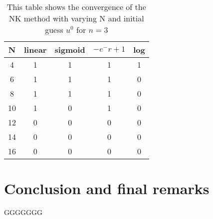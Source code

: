 \documentclass{article}
\begin{document}
\begin{table}[H]
\centering
\begin{tabular}{|c|c|c|c|c|}
\hline
N                                          & linear  & sigmoid & $-e^-r + 1$ &log \\
\hline
4                                          & 1 & 1 & 1 & 1\\
6                                          & 1 & 1 & 1 & 0\\
8                                          & 1 & 1 & 1 & 0\\
10                                         & 1 & 0 & 1 & 0\\
12                                         & 0 & 0 & 0 & 0\\
14                                         & 0 & 0 & 0 & 0\\
16                                         & 0 & 0 & 0 & 0\\
\hline
\end{tabular}
\caption{This table shows the convergence of the NK method with varying N and initial guess $u^0$ for $n=3$}
\end{table}

\section{Conclusion and final remarks}
GGGGGGG
\end{document}
